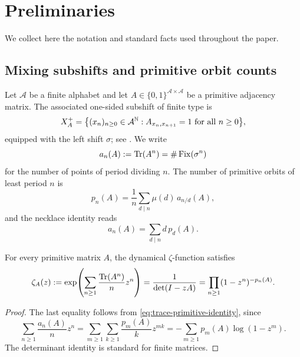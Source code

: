 \section{Preliminaries}\label{sec:preliminaries}

We collect here the notation and standard facts used throughout the
paper.

\subsection{Mixing subshifts and primitive orbit counts}

Let \(\mathcal A\) be a finite alphabet and let
\(A\in\{0,1\}^{\mathcal A\times\mathcal A}\) be a primitive adjacency
matrix. The associated one-sided subshift of finite type is
\[
  X_A^+
  =\bigl\{(x_n)_{n\ge 0}\in \mathcal A^{\mathbb{N}}:
    A_{x_n,x_{n+1}}=1\ \text{for all }n\ge 0\bigr\},
\]
equipped with the left shift \(\sigma\); see \cite[Ch.~2]{LindMarcus1995}.
We write
\[
  a_n(A):=\operatorname{Tr}(A^n)=\#\operatorname{Fix}(\sigma^n)
\]
for the number of points of period dividing \(n\). The number of
primitive orbits of least period \(n\) is
\begin{equation}\label{eq:primitive-mobius}
  p_n(A)=\frac{1}{n}\sum_{d\mid n}\mu(d)\,a_{n/d}(A),
\end{equation}
and the necklace identity reads
\begin{equation}\label{eq:trace-primitive-identity}
  a_n(A)=\sum_{d\mid n}d\,p_d(A).
\end{equation}

\begin{proposition}
  \label{prop:prelim-trace-primitive}
  For every primitive matrix \(A\), the dynamical \(\zeta\)-function
  satisfies
  \begin{equation}\label{eq:zeta-def}
    \zeta_A(z)
    :=\exp\!\left(\sum_{n\ge 1}\frac{\operatorname{Tr}(A^n)}{n}z^n\right)
    =\frac{1}{\det(I-zA)}
    =\prod_{n\ge 1}(1-z^n)^{-p_n(A)}.
  \end{equation}
\end{proposition}

\begin{proof}
  The last equality follows from \eqref{eq:trace-primitive-identity},
  since
  \[
    \sum_{n\ge 1}\frac{a_n(A)}{n}z^n
    =\sum_{m\ge 1}\sum_{k\ge 1}\frac{p_m(A)}{k}z^{mk}
    =-\sum_{m\ge 1}p_m(A)\log(1-z^m).
  \]
  The determinant identity is standard for finite matrices.
\end{proof}

